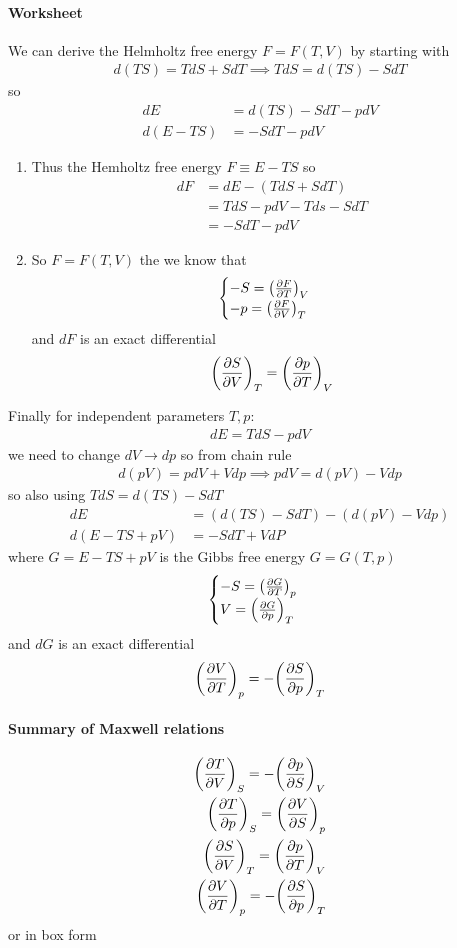 \documentclass[../main.tex]{subfiles}
\begin{document}
\paragraph{Worksheet}
We can derive the Helmholtz free energy $F = F(T,V)$ by starting with
\begin{align*}
    d(TS) = TdS + SdT \implies TdS = d(TS) - SdT
\end{align*}
so
\begin{align*}
    dE &= d(TS) -SdT - pdV \\
    d(E - TS) &= -SdT - pdV
\end{align*}
\begin{enumerate}
    \item Thus the Hemholtz free energy $F \equiv E - TS$ so
    \begin{align*}
        dF &= dE - (TdS + SdT) \\
        &= TdS - pdV - Tds - SdT \\
        &= -SdT - pdV
    \end{align*}
    \item So $F = F(T,V)$ the we know that
    \begin{align*}
        \begin{cases}
            -S = \qt(\pdv{F}{T})_V \\
            -p = \qt(\pdv{F}{V})_T
        \end{cases}
    \end{align*}
    and $dF$ is an exact differential
    \begin{align*}
        \qt(\pdv{S}{V})_T = \qt(\pdv{p}{T})_V
    \end{align*}
\end{enumerate}
Finally for independent parameters $T,p$:
\begin{align*}
    dE = TdS - pdV 
\end{align*}
we need to change $dV \to dp$ so from chain rule
\begin{align*}
    d(pV) = p dV + V dp \implies pdV = d(pV) - V dp 
\end{align*}
so also using $TdS = d(TS) - S dT$
\begin{align*}
    dE &= (d(TS) - S dT) - (d(pV) - V dp) \\
    d(E - TS + pV) &= -S dT + V dP
\end{align*}
where $G = E - TS + pV$ is the Gibbs free energy $G = G(T,p)$
\begin{align*}
    \begin{cases}
        -S = \qt(\pdv{G}{T})_p \\
        V = \qt(\pdv{G}{p})_T
    \end{cases}
\end{align*}
and $dG$ is an exact differential
\begin{align*}
    \qt(\pdv{V}{T})_p = -\qt(\pdv{S}{p})_T
\end{align*}
\paragraph{Summary of Maxwell relations}
\begin{align*}
    \qt(\pdv{T}{V})_S = -\qt(\pdv{p}{S})_V \\
    \qt(\pdv{T}{p})_S = \qt(\pdv{V}{S})_p \\
    \qt(\pdv{S}{V})_T = \qt(\pdv{p}{T})_V \\
    \qt(\pdv{V}{T})_p = -\qt(\pdv{S}{p})_T
\end{align*}
or in box form
\table
\end{document}
